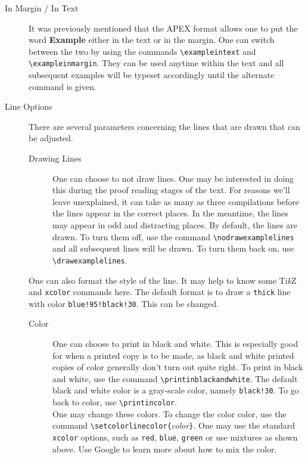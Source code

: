 \documentclass[10pt]{article}
\begin{document}
\begin{description}
\item [In Margin / In Text]
It was previously mentioned that the APEX format allows one to put the word {\bf Example} either in the text or in the margin. One can switch between the two by using the commands \verb|\exampleintext| and \verb|\exampleinmargin|. They can be used anytime within the text and all subsequent examples will be typeset accordingly until the alternate command is given.

\item	[Line Options] There are several parameters concerning the lines that are drawn that can be adjusted.

	\begin{description}
	\item	[Drawing Lines] 
One can choose to not draw lines. One may be interested in doing this during the proof reading stages of the text. For reasons we'll leave unexplained, it can take as many as three compilations before the lines appear in the correct places. In the meantime, the lines may appear in odd and distracting places. By default, the lines are drawn. To turn them off, use the command \verb|\nodrawexamplelines| and all subsequent lines will be drawn. To turn them back on, use \verb|\drawexamplelines|.
	\end{description}
One can also format the style of the line. It may help to know some Ti{\it k}Z and \verb|xcolor| commands here. The default format is to draw a \verb|thick| line with color \verb|blue!95!black!30|. This can be changed.
		\begin{description}
		\item [Color] One can choose to print in black and white. This is especially good for when a printed copy is to be made, as black and white printed copies of color generally don't turn out quite right. To print in black and white, use the command \verb|\printinblackandwhite|. The default black and white color is a gray-scale color, namely \verb|black!30|. To go back to color, use \verb|\printincolor|. \\
		
		One may change these colors. To change the color color, use the command \verb|\setcolorlinecolor{|{\it color}\verb|}|. One may use the standard \verb|xcolor| options, such as \verb|red|, \verb|blue|, \verb|green| or use mixtures as shown above. Use Google to learn more about how to mix the color.\\
		

\end{description}
\end{description}
\end{document}
